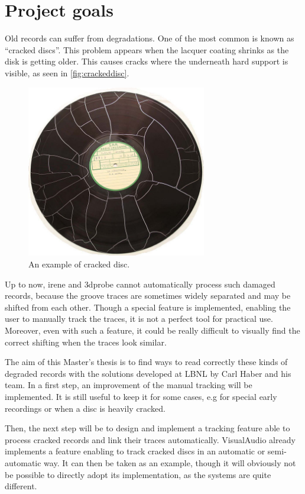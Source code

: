 \section{Project goals}

Old records can suffer from degradations. One of the most common is known as ``cracked discs''. This problem appears when the lacquer coating shrinks as the disk is getting older. This causes cracks where the underneath hard support is visible, as seen in \autoref{fig:crackeddisc}.

\begin{figure}[!ht]
\centering
\includegraphics[width=0.7\textwidth]{images/cracked-disc}
\caption{An example of cracked disc.}
\label{fig:crackeddisc}
\end{figure}

Up to now, \gls{irene} and \gls{3dprobe} cannot automatically process such damaged records, because the groove traces are sometimes widely separated and may be shifted from each other. Though a special feature is implemented, enabling the user to manually track the traces, it is not a perfect tool for practical use. Moreover, even with such a feature, it could be really difficult to visually find the correct shifting when the traces look similar.

The aim of this Master's thesis is to find ways to read correctly these kinds of degraded records with the solutions developed at LBNL by Carl Haber and his team. In a first step, an improvement of the manual tracking will be implemented. It is still useful to keep it for some cases, e.g for special early recordings or when a disc is heavily cracked.

Then, the next step will be to design and implement a tracking feature able to process cracked records and link their traces automatically. VisualAudio already implements a feature enabling to track cracked discs in an automatic or semi-automatic way. It can then be taken as an example, though it will obviously not be possible to directly adopt its implementation, as the systems are quite different.


